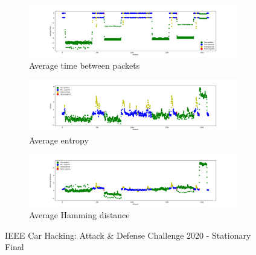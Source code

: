 \begin{figure}
    \centering
    \begin{subfigure}[b]{\linewidth}
        \includegraphics[width = \linewidth]{img/parts/app/tests/ieee/stationary_final/AvgTime.png}
        \caption{Average time between packets}
        \label{subfig:extract_ieee_s_f_avgtime}
    \end{subfigure}
    \begin{subfigure}[b]{\linewidth}
        \includegraphics[width = \linewidth]{img/parts/app/tests/ieee/stationary_final/Entropy.png}
        \caption{Average entropy}
        \label{subfig:extract_ieee_s_f_entropy}
    \end{subfigure}
    \begin{subfigure}[b]{\linewidth}
        \includegraphics[width = \linewidth]{img/parts/app/tests/ieee/stationary_final/HammingDist.png}
        \caption{Average Hamming distance}
        \label{subfig:extract_ieee_s_f_hammingdist}
    \end{subfigure}
    \caption{IEEE Car Hacking: Attack \& Defense Challenge 2020 - Stationary Final}
    \label{fig:extract_ieee_s_f}
\end{figure}

